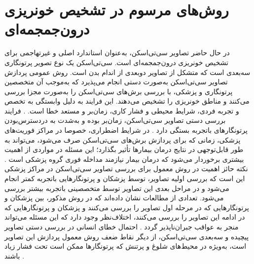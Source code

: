   
\section{روش‌های مرسوم در تشخیص خونریزی درون‌جمجمه‌ای}

در حال حاضر تصاویر سی‌تی‌اسکن، به‌عنوان استاندارد اصلی و غیرتهاجمی
برای تشخیص خونریزی‌ درون‌جمجمه‌ای است. سی‌تی‌اسکن یک نوع تصویر پرتونگاری
سه‌بعدی است که متشکل از تصاویر دوبعدی از اندام بدن است. روش عمومی پردازش تصاویر سی‌تی‌اسکن به‌صورت دستی انجام می‌پذیرد که به‌موجب آن متخصصین پرتونگاری
 و پزشکی، با بررسی برش‌های
سی‌تی‌اسکن را به‌صورت مجزا بررسی می‌کنند و مناطق خونریزی را تشخیص می‌دهند. این فرایند به دلیل وابستگی به تخصص و تجربه فردی، شرایط محیطی و فشار کاری، زمان‌بر و مستعد خطا است. \cite{arbabshirani2018advanced,grewal2018radnet,ye2019precise,chilamkurthy2018deep,kuo2019expert}.
فرایند بررسی دستی تصاویر سی‌تی‌اسکن، زمان‌بر بوده و به‌شدت به دردسترس‌بودن پرتونگار‌های 
باتجربه بستگی دارد \cite{burduja2020accurate}.
 در شرایط اضطراری، خصوصا در مراکز فوریت‌های پزشکی، زمانی که برای پردازش برش‌های سی‌تی‌اسکن صرف می‌شود، می‌تواند به طور قابل‌توجهی در نتایج درمان بیمارها تأثیر بگذارد؛ این مسئله در مواردی از اهمیت بیشتری برخوردار می‌شود که درمان بیمار نیازمند مداخله فوری گروه پزشکی است \cite{chilamkurthy2018deep}. نکته حائز اهمیت در روش معمول برای بررسی تصاویر سی‌تی‌اسکن در مراکز پزشکی این است که بررسی اولیه تصاویر، توسط پزشکان و پرتونگار‌هایی باتجربه کمتر انجام می‌شود و در مراحل بعدی این تصاویر توسط متخصصینی باتجربه بیشتر بررسی می‌شود. تعدادی از مطالعات نشان داده‌اند که در روش مذکور،‌ بین پزشکان و پرتونگار‌هایی که در مرحله اول تصاویر را بررسی می‌کنند و پزشکان و پرتونگار‌هایی که در ادامه این تصاویر را بررسی می‌کنند،‌ اختلاف‌نظر وجود دارد که این مسئله می‌تواند منجر به عواقب جبران‌ناپذیر گردد
\cite{ye2019precise, alfaro1995accuracy, lal2000clinical, erly2002radiology, strub2007overnight}.
   احتمال خطای انسانی در بررسی دستی تصاویر پیچیده و سه‌بعدی سی‌تی‌اسکن، از دیگر نقاط ضعف روش معمول پردازش این تصاویر است، به‌ویژه در محیط‌های شلوغ و پرتنش که پرتونگار‌ها ممکن است تحت فشار زیاد باشند \cite{ye2019precise}.
   

